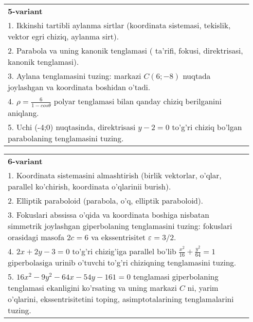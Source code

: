\documentclass{article}
\begin{document}
\begin{tabular}{m{17cm}}
\textbf{5-variant}\\
1. Ikkinshi tartibli aylanma sirtlar (koordinata sistemasi, tekislik, vektor egri chiziq, aylanma sirt).\\

2. Parabola va uning kanonik tenglamasi ( ta'rifi, fokusi, direktrisasi, kanonik tenglamasi).\\

3. Aylana tenglamasini tuzing: markazi $C(6;-8)$ nuqtada joylashgan va koordinata boshidan o'tadi.\\

4. $\rho = \frac{6}{1 - cos\theta}$ polyar tenglamasi bilan qanday chiziq berilganini aniqlang.  \\

5. Uchi (-4;0) nuqtasinda, direktrisasi $y - 2 = 0$ to'g'ri chiziq bo'lgan parabolaning tenglamasini tuzing.
\end{tabular}
\vspace{1cm}


\begin{tabular}{m{17cm}}
\textbf{6-variant}\\
1. Koordinata sistemasini almashtirish (birlik vektorlar, o'qlar, parallel ko'chirish, koordinata o'qlarinii burish).\\

2. Elliptik paraboloid (parabola, o'q, elliptik paraboloid).\\

3. Fokuslari abssissa o'qida va koordinata boshiga nisbatan simmetrik joylashgan giperbolaning tenglamasini tuzing: fokuslari orasidagi masofa $2c=6$ va ekssentrisitet $\varepsilon=3/2$.\\

4. $2x + 2y - 3 = 0$ to'g'ri chizig'iga parallel bo'lib $\frac{x^{2}}{16} + \frac{y^{2}}{64} = 1$ giperbolasiga urinib o'tuvchi to'g'ri chiziqning tenglamasini tuzing.  \\

5. $16x^{2} - 9y^{2} - 64x - 54y - 161 = 0$ tenglamasi giperbolaning tenglamasi ekanligini ko'rsating va uning markazi $C$ ni, yarim o'qlarini, ekssentrisitetini toping, asimptotalarining tenglamalarini tuzing.  
\end{tabular}
\vspace{1cm}
\end{document}
